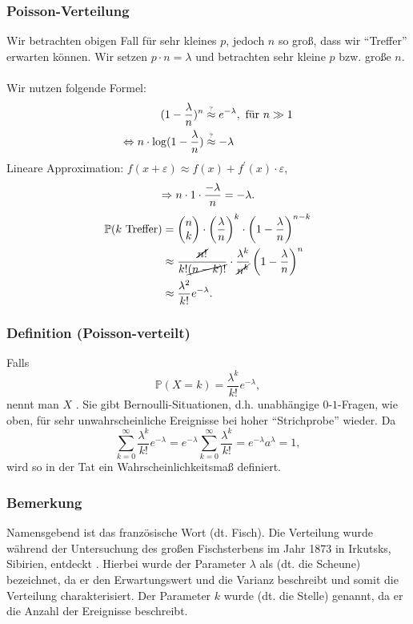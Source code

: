 \subsubsection{Poisson-Verteilung}
Wir betrachten obigen Fall f\"ur sehr kleines $p$, jedoch $n$ so gro\ss{}, dass wir ``Treffer'' erwarten k\"onnen. Wir setzen $p\cdot n=\lambda$ und betrachten sehr kleine $p$ bzw. gro\ss{}e $n$.
\\~\\
Wir nutzen folgende Formel:
\begin{align*}
(1-\frac{\lambda}{n})^n&\textabove{?}{\approx} e^{-\lambda},\ \text{f\"ur }n\gg1\\
\LRA n\cdot\log(1-\frac{\lambda}{n})&\textabove{?}{\approx}-\lambda\\
\end{align*}
Lineare Approximation: $f(x+\varepsilon)\approx f(x)+f^\prime(x)\cdot\varepsilon$,
\[
\Rightarrow n\cdot1\cdot\frac{-\lambda}{n}=-\lambda.
\]
\begin{align*}
\mathbb{P}(k\text{ Treffer})&=\begin{pmatrix}n\\k\end{pmatrix}\cdot\left(\frac{\lambda}{n}\right)^k\cdot\left(1-\frac{\lambda}{n}\right)^{n-k}\\
&\approx\frac{\cancel{n!}}{k!\cancel{(n-k)!}}\cdot\frac{\lambda^k}{\cancel{n^k}}\left(1-\frac{\lambda}{n}\right)^n\\
&\approx\frac{\lambda^2}{k!}e^{-\lambda}.
\end{align*}
\subsubsection{Definition (Poisson-verteilt)}
Falls
\[\mathbb{P}(X=k)=\frac{\lambda^k}{k!}e^{-\lambda},\]
nennt man $X$ . Sie gibt Bernoulli-Situationen, d.h. unabh\"angige $0$-$1$-Fragen, wie oben, f\"ur sehr unwahrscheinliche Ereignisse bei hoher ``Strichprobe'' wieder. Da
\[
\sum_{k=0}^\infty\frac{\lambda^k}{k!}e^{-\lambda}=e^{-\lambda}\sum_{k=0}^\infty\frac{\lambda^k}{k!}=e^{-\lambda}a^{\lambda}=1,
\]
wird so in der Tat ein Wahrscheinlichkeitsma\ss{} definiert.
\subsubsection{Bemerkung}
Namensgebend ist das franz\"osische Wort  (dt. Fisch). Die Verteilung wurde w\"ahrend der Untersuchung des gro\ss{}en Fischsterbens im Jahr 1873 in Irkutsks, Sibirien, entdeckt \cite{Pickl15}. Hierbei wurde der Parameter $\lambda$ als  (dt. die Scheune) bezeichnet, da er den Erwartungswert und die Varianz beschreibt und somit die Verteilung charakterisiert. Der Parameter $k$ wurde  (dt. die Stelle) genannt, da er die Anzahl der Ereignisse beschreibt.

